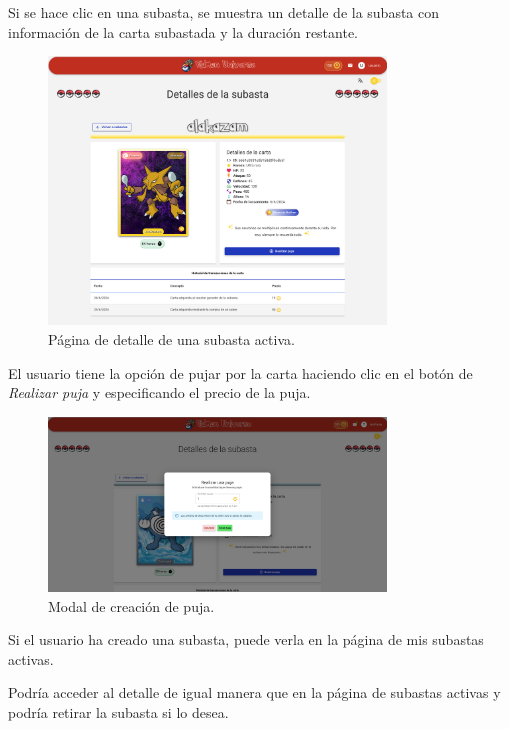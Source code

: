 \begin{enumerate}
Si se hace clic en una subasta, se muestra un detalle de la subasta con información de la carta subastada y la duración restante.

\begin{figure}[H]
    \centering
    \includegraphics[width=0.8\textwidth]{figures/6-Analisis/6-Interfaz/interfaz/detalle_subasta.png}
    \caption{Página de detalle de una subasta activa.}
    \label{fig:m-interfaz-detalle-subasta}
\end{figure}


El usuario tiene la opción de pujar por la carta haciendo clic en el botón de \textit{Realizar puja} y especificando el precio de la puja.
\begin{figure}[H]
    \centering
    \includegraphics[width=0.8\textwidth]{figures/6-Analisis/6-Interfaz/interfaz/crear-puja.png}
    \caption{Modal de creación de puja.}
    \label{fig:m-interfaz-puja}
\end{figure}


Si el usuario ha creado una subasta, puede verla en la página de mis subastas activas.


Podría acceder al detalle de igual manera que en la página de subastas activas
y podría retirar la subasta si lo desea.


\end{enumerate}

